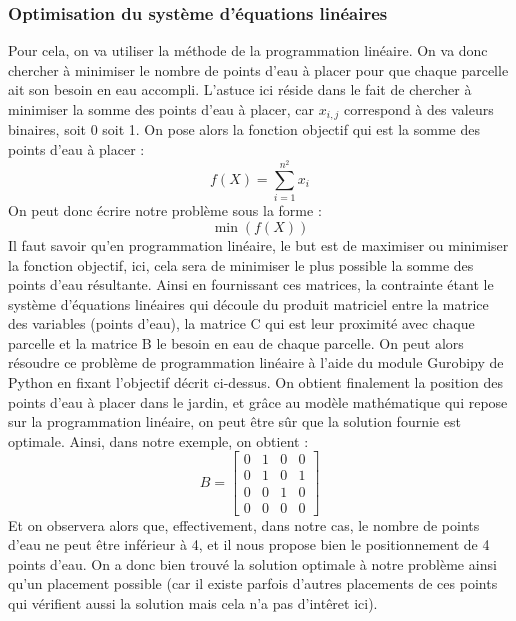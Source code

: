\documentclass[french,a4paper]{article}
\begin{document}
\subsubsection{Optimisation du système d'équations linéaires}
Pour cela, on va utiliser la méthode de la programmation linéaire. On va donc chercher à minimiser le nombre de points d'eau à placer pour que chaque parcelle ait son besoin en eau accompli. L'astuce ici réside dans le fait de chercher à minimiser la somme des points d'eau à placer, car $x_{i,j}$ correspond à des valeurs binaires, soit 0 soit 1.
\newline On pose alors la fonction objectif qui est la somme des points d'eau à placer :
\newline
\newline \begin{equation} f(X) = \sum_{i=1}^{n^2} x_i \end{equation}
\newline
\newline On peut donc écrire notre problème sous la forme :
\newline
\newline \begin{equation} \min (f(X)) \end{equation}
\newline
\newline Il faut savoir qu'en programmation linéaire, le but est de maximiser ou minimiser la fonction objectif, ici, cela sera de minimiser le plus possible la somme des points d'eau résultante.
\newline Ainsi en fournissant ces matrices, la contrainte étant le système d'équations linéaires qui découle du produit matriciel entre la matrice des variables (points d'eau), la matrice C qui est leur proximité avec chaque parcelle et la matrice B le besoin en eau de chaque parcelle. On peut alors résoudre ce problème de programmation linéaire à l'aide du module Gurobipy de Python en fixant l'objectif décrit ci-dessus.
\newline On obtient finalement la position des points d'eau à placer dans le jardin, et grâce au modèle mathématique qui repose sur la programmation linéaire, on peut être sûr que la solution fournie est optimale.
\newline Ainsi, dans notre exemple, on obtient :
\newline
\[ B = \begin{bmatrix} 0 & 1 & 0 & 0 \\ 0 & 1 & 0 & 1 \\ 0 & 0 & 1 & 0 \\ 0 & 0 & 0 & 0 \end{bmatrix}\]
\newline
Et on observera alors que, effectivement, dans notre cas, le nombre de points d'eau ne peut être inférieur à 4, et il nous propose bien le positionnement de 4 points d'eau.
On a donc bien trouvé la solution optimale à notre problème ainsi qu'un placement possible (car il existe parfois d'autres placements de ces points qui vérifient aussi la solution mais cela n'a pas d'intêret ici).
\end{document}
